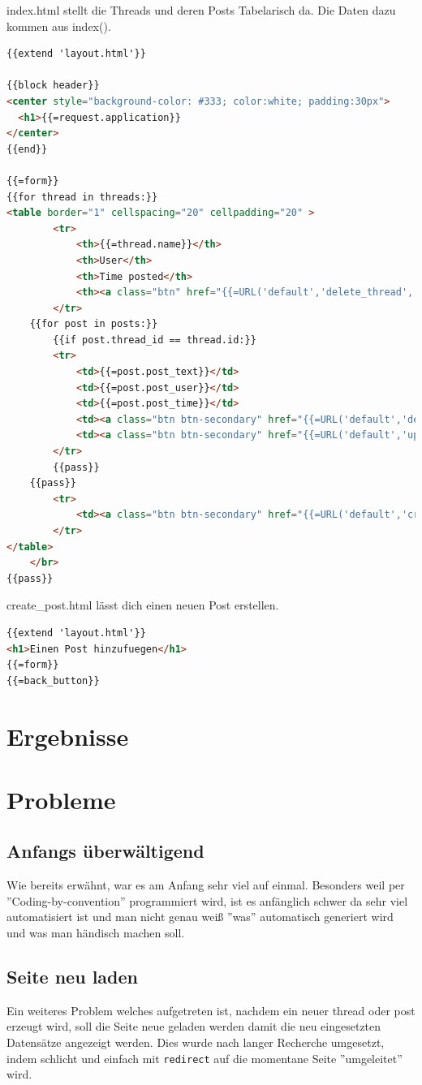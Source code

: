index.html stellt die Threads und deren Posts Tabelarisch da. Die Daten dazu kommen aus index().
\begin{lstlisting}[language=html]
{{extend 'layout.html'}}

{{block header}}
<center style="background-color: #333; color:white; padding:30px">
  <h1>{{=request.application}}
</center>
{{end}}

{{=form}}
{{for thread in threads:}}
<table border="1" cellspacing="20" cellpadding="20" >
        <tr>
            <th>{{=thread.name}}</th>
            <th>User</th>
            <th>Time posted</th>
            <th><a class="btn" href="{{=URL('default','delete_thread', args=[thread.id])}}">{{=T('Thread loeschen')}}</a></th>
        </tr>
    {{for post in posts:}}
        {{if post.thread_id == thread.id:}}
        <tr>
            <td>{{=post.post_text}}</td>
            <td>{{=post.post_user}}</td>
            <td>{{=post.post_time}}</td>
            <td><a class="btn btn-secondary" href="{{=URL('default','delete_post', args=[post.id])}}">{{=T('Post loeschen')}}</a></td>
            <td><a class="btn btn-secondary" href="{{=URL('default','update_post', args=[post, post.post_user, post.thread_id, post.id])}}">{{=T('Post updaten')}}</a></td>
        </tr>
        {{pass}}
    {{pass}}
        <tr>
            <td><a class="btn btn-secondary" href="{{=URL('default','create_post', args=[thread.id])}}">{{=T('Post hinzufuegen')}}</a></td>
        </tr>
</table>
    </br>
{{pass}}
\end{lstlisting}

create\_post.html lässt dich einen neuen Post erstellen.
\begin{lstlisting}[language=html]
{{extend 'layout.html'}}
<h1>Einen Post hinzufuegen</h1>
{{=form}}
{{=back_button}}
\end{lstlisting}

\section{Ergebnisse}
\section{Probleme}
\subsection{Anfangs überwältigend}
Wie bereits erwähnt, war es am Anfang sehr viel auf einmal. Besonders weil per ''Coding-by-convention'' programmiert wird, ist es anfänglich schwer da sehr viel automatisiert ist und man nicht genau weiß ''was'' automatisch generiert wird und was man händisch machen soll.

\subsection{Seite neu laden}
Ein weiteres Problem welches aufgetreten ist, nachdem ein neuer thread oder post erzeugt wird, soll die Seite neue geladen werden damit die neu eingesetzten Datensätze angezeigt werden. Dies wurde nach langer Recherche umgesetzt, indem schlicht und einfach mit \verb|redirect| auf die momentane Seite ''umgeleitet'' wird.

